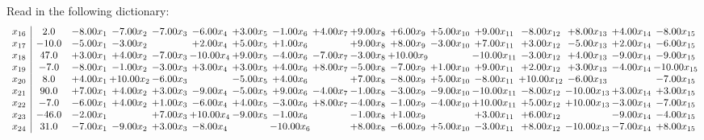 \documentclass[9pt]{article}
\begin{document}
Read in the following dictionary:
\[\begin{array}{c| c c@{\hskip 2pt} c@{\hskip 2pt} c@{\hskip 2pt} c@{\hskip 2pt} c@{\hskip 2pt} c@{\hskip 2pt} c@{\hskip 2pt} c@{\hskip 2pt} c@{\hskip 2pt} c@{\hskip 2pt} c@{\hskip 2pt} c@{\hskip 2pt} c@{\hskip 2pt} c@{\hskip 2pt} c@{\hskip 2pt} }
 x_{16}   &  2.0 & -8.00 x_{1} & -7.00 x_{2} & -7.00 x_{3} & -6.00 x_{4} & +  3.00 x_{5} & -1.00 x_{6} & +  4.00 x_{7} & +  9.00 x_{8} & +  6.00 x_{9} & +  5.00 x_{10} & +  9.00 x_{11} & -8.00 x_{12} & +  8.00 x_{13} & +  4.00 x_{14} & -8.00 x_{15}\\
 x_{17}   &  -10.0 & -5.00 x_{1} & -3.00 x_{2} &   & +  2.00 x_{4} & +  5.00 x_{5} & +  1.00 x_{6} &   & +  9.00 x_{8} & +  8.00 x_{9} & -3.00 x_{10} & +  7.00 x_{11} & +  3.00 x_{12} & -5.00 x_{13} & +  2.00 x_{14} & -6.00 x_{15}\\
 x_{18}   &  47.0 & +  3.00 x_{1} & +  4.00 x_{2} & -7.00 x_{3} & -10.00 x_{4} & +  9.00 x_{5} & -4.00 x_{6} & -7.00 x_{7} & -3.00 x_{8} & + 10.00 x_{9} &   & -10.00 x_{11} & -3.00 x_{12} & +  4.00 x_{13} & -9.00 x_{14} & -9.00 x_{15}\\
 x_{19}   &  -7.0 & -8.00 x_{1} & -1.00 x_{2} & -3.00 x_{3} & +  3.00 x_{4} & +  3.00 x_{5} & +  4.00 x_{6} & +  8.00 x_{7} & -5.00 x_{8} & -7.00 x_{9} & +  1.00 x_{10} & +  9.00 x_{11} & +  2.00 x_{12} & +  3.00 x_{13} & -4.00 x_{14} & -10.00 x_{15}\\
 x_{20}   &  8.0 & +  4.00 x_{1} & + 10.00 x_{2} & -6.00 x_{3} &   & -5.00 x_{5} & +  4.00 x_{6} &   & +  7.00 x_{8} & -8.00 x_{9} & +  5.00 x_{10} & -8.00 x_{11} & + 10.00 x_{12} & -6.00 x_{13} &   & -7.00 x_{15}\\
 x_{21}   &  90.0 & +  7.00 x_{1} & +  4.00 x_{2} & +  3.00 x_{3} & -9.00 x_{4} & -5.00 x_{5} & +  9.00 x_{6} & -4.00 x_{7} & -1.00 x_{8} & -3.00 x_{9} & -9.00 x_{10} & -10.00 x_{11} & -8.00 x_{12} & -10.00 x_{13} & +  3.00 x_{14} & +  3.00 x_{15}\\
 x_{22}   &  -7.0 & -6.00 x_{1} & +  4.00 x_{2} & +  1.00 x_{3} & -6.00 x_{4} & +  4.00 x_{5} & -3.00 x_{6} & +  8.00 x_{7} & -4.00 x_{8} & -1.00 x_{9} & -4.00 x_{10} & + 10.00 x_{11} & +  5.00 x_{12} & + 10.00 x_{13} & -3.00 x_{14} & -7.00 x_{15}\\
 x_{23}   &  -46.0 & -2.00 x_{1} &   & +  7.00 x_{3} & + 10.00 x_{4} & -9.00 x_{5} & -1.00 x_{6} &   & -1.00 x_{8} & +  1.00 x_{9} &   & +  3.00 x_{11} & +  6.00 x_{12} &   & -9.00 x_{14} & -4.00 x_{15}\\
 x_{24}   &  31.0 & -7.00 x_{1} & -9.00 x_{2} & +  3.00 x_{3} & -8.00 x_{4} &   & -10.00 x_{6} &   & +  8.00 x_{8} & -6.00 x_{9} & +  5.00 x_{10} & -3.00 x_{11} & +  8.00 x_{12} & -10.00 x_{13} & -7.00 x_{14} & +  8.00 x_{15}\\

\end{array}\]
\end{document}
